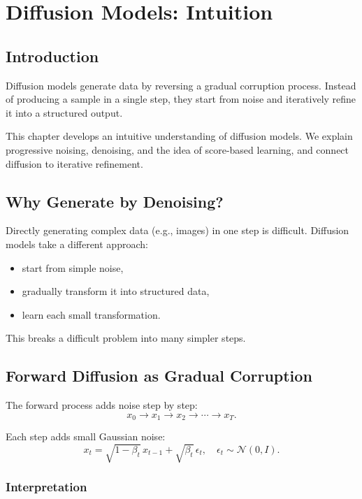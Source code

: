 \chapter{Diffusion Models: Intuition}

\section{Introduction}

Diffusion models generate data by reversing a gradual corruption process. Instead of producing a sample in a single step, they start from noise and iteratively refine it into a structured output.

This chapter develops an intuitive understanding of diffusion models. We explain progressive noising, denoising, and the idea of score-based learning, and connect diffusion to iterative refinement.

\section{Why Generate by Denoising?}

Directly generating complex data (e.g., images) in one step is difficult. Diffusion models take a different approach:
\begin{itemize}
    \item start from simple noise,
    \item gradually transform it into structured data,
    \item learn each small transformation.
\end{itemize}

This breaks a difficult problem into many simpler steps.

\section{Forward Diffusion as Gradual Corruption}

The forward process adds noise step by step:
\[
x_0 \to x_1 \to x_2 \to \cdots \to x_T.
\]

Each step adds small Gaussian noise:
\[
x_t = \sqrt{1 - \beta_t} \, x_{t-1} + \sqrt{\beta_t} \, \epsilon_t,
\quad \epsilon_t \sim \mathcal{N}(0,I).
\]

\subsection{Interpretation}

